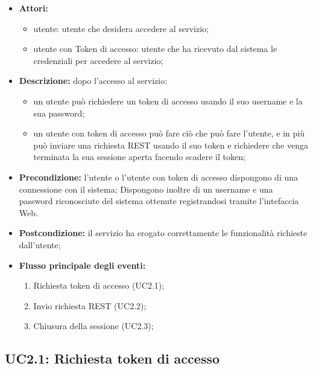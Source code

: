 \begin{itemize}
	\item \textbf{Attori:}
	\begin{itemize}
		\item utente: utente che desidera accedere al servizio;
		\item utente con Token di accesso: utente che ha ricevuto dal sistema le credenziali per accedere al servizio;
	\end{itemize}
	\item \textbf{Descrizione:} dopo l'accesso al servizio:
	\begin{itemize}
		\item un utente può richiedere un token di accesso usando il suo username e la sua password;
		\item un utente con token di accesso può fare ciò che può fare l'utente, e in più può inviare una richiesta REST usando il suo token e richiedere che venga terminata la sua sessione aperta facendo scadere il token;
	\end{itemize}
	\item \textbf{Precondizione:} l'utente o l'utente con token di accesso dispongono di una connessione con il sistema; Dispongono inoltre di un username e una password riconosciute del sistema ottenute registrandosi tramite l'intefaccia Web.
	\item \textbf{Postcondizione:} il servizio ha erogato correttamente le funzionalità richieste dall'utente;
	\item \textbf{Flusso principale degli eventi:}
	\begin{enumerate}
		\item Richiesta token di accesso (UC2.1);
		\item Invio richiesta REST (UC2.2);
		\item Chiusura della sessione (UC2.3);
	\end{enumerate}
\end{itemize}

\pagebreak

\subsection{UC2.1: Richiesta token di accesso}


